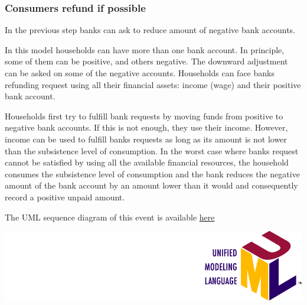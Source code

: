 \documentclass{book}
\newcommand{\doclocation}{file:///Users/giulioni/Documents/workspace/gabriele/docs}
\begin{document}
\subsubsection{Consumers refund if possible}

In the previous step banks can ask to reduce amount of negative bank accounts. 

In this model households can have more than one bank account. In principle, some of them can be positive, and others negative. The downward adjustment can be asked on some of the negative accounts.  Households can face banks refunding request using all their financial assets: income (wage) and their positive bank account. 

Households first try to fulfill bank requests by moving funds from positive to negative bank accounts. If this is not enough, they use their income. However, income can be used to fulfill banks requests as long as its amount is not lower than the subsistence level of consumption. In the worst case where banks request cannot be satisfied by using all the available financial resources, the household consumes the subsistence level of consumption and the bank reduces the negative amount of the bank account by an amount lower than it would and consequently record a positive unpaid amount.     

The UML sequence diagram of this event is available \href{\doclocation/umldoc/payBackBankDebt.html}{here}
\begin{marginfigure}
	\includegraphics[scale=0.1]{uml.png}
\end{marginfigure}


\end{document}
